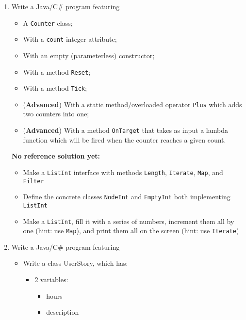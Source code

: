 \begin{enumerate}
            \item Write a Java/C\# program featuring
            \begin{itemize}
                \item A \texttt{Counter} class;
                \item With a \texttt{count} integer attribute;
                \item With an empty (parameterless) constructor;
                \item With a method \texttt{Reset};
                \item With a method \texttt{Tick};
                \item (\textbf{Advanced}) With a static method/overloaded operator \texttt{Plus} which adds two counters into one;
                \item (\textbf{Advanced}) With a method \texttt{OnTarget} that takes as input a lambda function which will be fired when the counter reaches a given count.
            \end{itemize}
            
	        \textbf{No reference solution yet:}
	        \begin{itemize}
	        	\item Make a \texttt{ListInt} interface with methods \texttt{Length}, \texttt{Iterate}, \texttt{Map}, and \texttt{Filter}
	        	\item Define the concrete classes \texttt{NodeInt} and \texttt{EmptyInt} both implementing \texttt{ListInt}
	        	\item Make a \texttt{ListInt}, fill it with a series of numbers, increment them all by one (hint: use \texttt{Map}), and print them all on the screen (hint: use \texttt{Iterate})
	        \end{itemize}

            \item Write a Java/C\# program featuring
                \begin{itemize}
                    \item Write a class UserStory, which has:
                    \begin{itemize}
                        \item 2 variables:
                            \begin{itemize}
                                \item hours
                                \item description
                            \end{itemize}


\end{itemize}
\end{itemize}
\end{enumerate}
